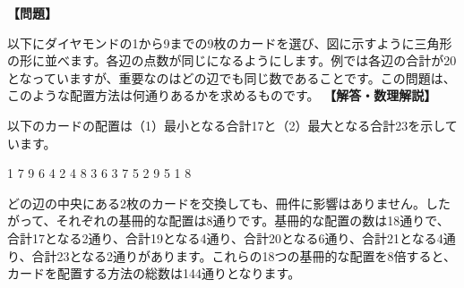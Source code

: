 \documentclass[10pt,a4paper,oneside,openany]{ltjsbook}
\begin{document}
\begin{tcolorbox}[colback=softblue,colframe=primaryblue,title=\textbf{第 384 問：カードの三角形配置 （原題: CARD TRIANGLES.）},arc=2mm,boxrule=1pt,breakable]
\textbf{【問題】}\par\vspace{0.3em}
以下にダイヤモンドの1から9までの9枚のカードを選び、図に示すように三角形の形に並べます。各辺の点数が同じになるようにします。例では各辺の合計が20となっていますが、重要なのはどの辺でも同じ数であることです。この問題は、このような配置方法は何通りあるかを求めるものです。
\tcblower
\textbf{【解答・数理解説】}\par\vspace{0.3em}
以下のカードの配置は（1）最小となる合計17と（2）最大となる合計23を示しています。

    1        7
   9 6      4 2
  4   8    3   6
 3 7 5 2  9 5 1 8

どの辺の中央にある2枚のカードを交換しても、冊件に影響はありません。したがって、それぞれの基冊的な配置は8通りです。基冊的な配置の数は18通りで、合計17となる2通り、合計19となる4通り、合計20となる6通り、合計21となる4通り、合計23となる2通りがあります。これらの18つの基冊的な配置を8倍すると、カードを配置する方法の総数は144通りとなります。
\end{tcolorbox}
\end{document}
